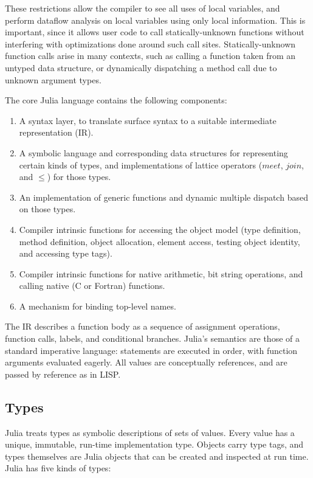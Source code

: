 \documentclass[9pt]{sigplanconf}
\begin{document}
These restrictions allow the compiler to see all uses of local
variables, and perform dataflow analysis on local variables using only
local information. This is important, since it allows user code to call
statically-unknown functions without interfering with optimizations done
around such call sites. Statically-unknown function calls arise in
many contexts, such as calling a function taken from an untyped data structure,
or dynamically dispatching a method call due to unknown argument types.

The core Julia language contains the following components:

\begin{enumerate}
\item A syntax layer, to translate surface syntax to a suitable
intermediate representation (IR).
\item A symbolic language and corresponding data structures for representing
certain kinds of types, and implementations of lattice operators ($meet$,
$join$, and $\leq$) for those types.
\item An implementation of generic functions and dynamic multiple dispatch
based on those types.
\item Compiler intrinsic functions for accessing the object model
(type definition, method definition, object allocation, element access,
testing object identity, and accessing type tags).
\item Compiler intrinsic functions for native arithmetic, bit string operations,
and calling native (C or Fortran) functions.
\item A mechanism for binding top-level names.
\end{enumerate}

The IR describes a function body as a sequence of assignment operations,
function calls, labels, and conditional branches. Julia's semantics
are those of a standard imperative language: statements are executed in order,
with function arguments evaluated eagerly. All values are conceptually
references, and are passed by reference as in LISP.


\subsection{Types}

Julia treats types as symbolic descriptions of sets of values. Every value has
a unique, immutable, run-time implementation type. Objects carry type tags, and
types themselves are Julia objects that can be created and inspected
at run time.
Julia has five kinds of types:
\end{document}
